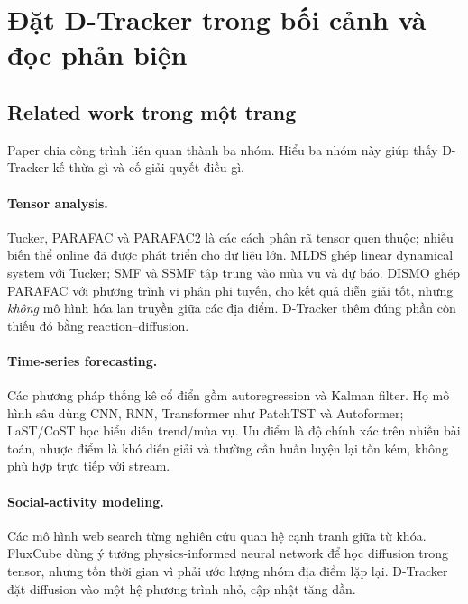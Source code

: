 \section{Đặt D-Tracker trong bối cảnh và đọc phản biện}
\label{sec:discussion}

\subsection{Related work trong một trang}

Paper chia công trình liên quan thành ba nhóm. Hiểu ba nhóm này giúp thấy D-Tracker kế thừa gì và
cố giải quyết điều gì.

\paragraph{Tensor analysis.}
Tucker, PARAFAC và PARAFAC2 là các cách phân rã tensor quen thuộc; nhiều biến thể online đã được
phát triển cho dữ liệu lớn. MLDS ghép linear dynamical system với Tucker; SMF và SSMF tập trung
vào mùa vụ và dự báo. DISMO ghép PARAFAC với phương trình vi phân phi tuyến, cho kết quả diễn giải
tốt, nhưng \emph{không} mô hình hóa lan truyền giữa các địa điểm. D-Tracker thêm đúng phần còn
thiếu đó bằng reaction--diffusion.

\paragraph{Time-series forecasting.}
Các phương pháp thống kê cổ điển gồm autoregression và Kalman filter. Họ mô hình sâu dùng CNN, RNN,
Transformer như PatchTST và Autoformer; LaST/CoST học biểu diễn trend/mùa vụ. Ưu điểm là độ chính
xác trên nhiều bài toán, nhược điểm là khó diễn giải và thường cần huấn luyện lại tốn kém, không
phù hợp trực tiếp với stream.

\paragraph{Social-activity modeling.}
Các mô hình web search từng nghiên cứu quan hệ cạnh tranh giữa từ khóa. FluxCube dùng ý tưởng
physics-informed neural network để học diffusion trong tensor, nhưng tốn thời gian vì phải ước lượng
nhóm địa điểm lặp lại. D-Tracker đặt diffusion vào một hệ phương trình nhỏ, cập nhật tăng dần.

